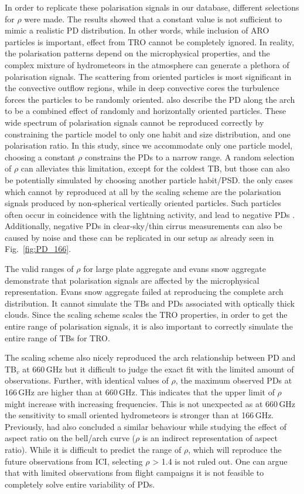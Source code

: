 \documentclass[amt, manuscript]{copernicus}
\begin{document}
In order to replicate these polarisation signals in our database,  different selections for $\rho$ were made. The results showed that a constant value is not sufficient to mimic a realistic PD distribution. In other words, while inclusion of ARO particles is important, effect from TRO cannot be completely ignored. In reality, the polarisation patterns depend on the microphysical properties, and the complex mixture of hydrometeors in the atmosphere can generate a plethora of polarisation signals. The scattering from oriented particles is most significant in the convective outflow regions, while in deep convective cores the turbulence forces the particles to be randomly oriented. \citet{gong:micro:17} also describe the PD along the arch to be a combined effect of randomly and horizontally oriented particles. These wide spectrum of polarisation signals cannot be reproduced correctly by constraining the particle model to only one habit and size distribution, and one polarisation ratio. In this study, since we accommodate only one particle model, choosing a constant $\rho$ constrains the PDs to a narrow range. A random selection of $\rho$ can alleviates this limitation, except for the coldest TB, but those can also be potentially simulated by choosing another particle habit/PSD. the only cases which cannot by reproduced at all by the scaling scheme are the polarisation signals produced by non-spherical vertically oriented particles. Such particles often occur in coincidence with the lightning activity, and lead to negative PDs \citep{prigent:relat:05}. Additionally, negative PDs in clear-sky/thin cirrus measurements can also be caused by noise and these can be replicated in our setup as already seen in Fig.~\ref{fig:PD_166}.  

The valid ranges of $\rho$ for large plate aggregate and evans snow aggregate demonstrate that polarisation signals are affected by the microphysical representation. Evans snow aggregate failed at reproducing the complete arch distribution. It cannot simulate the TBs and PDs associated with optically thick clouds. Since the scaling scheme scales the TRO properties, in order to get the entire range of polarisation signals, it is also important to correctly simulate the  entire range of TBs for TRO.

The scaling scheme also nicely reproduced the arch relationship between PD and TB$_v$ at 660\,GHz but it difficult to judge the exact fit with the limited amount of observations. Further, with identical values of $\rho$, the maximum observed PDs at 166\,GHz are higher than at 660\,GHz. This indicates that the upper limit of $\rho$ might increase with increasing frequencies. This is not unexpected as at 660\,GHz the sensitivity to small oriented hydrometeors is stronger than at 166\,GHz. Previously, \citet{gong:micro:17} had also concluded a similar behaviour while studying the effect of aspect ratio on the bell/arch curve ($\rho$ is an indirect representation of aspect ratio). While it is difficult to predict the range of $\rho$, which will reproduce the future observations from ICI, selecting $\rho$ > 1.4 is not ruled out. One can argue that with limited observations from flight campaigns it is not feasible to completely solve entire variability of PDs. 
\end{document}
